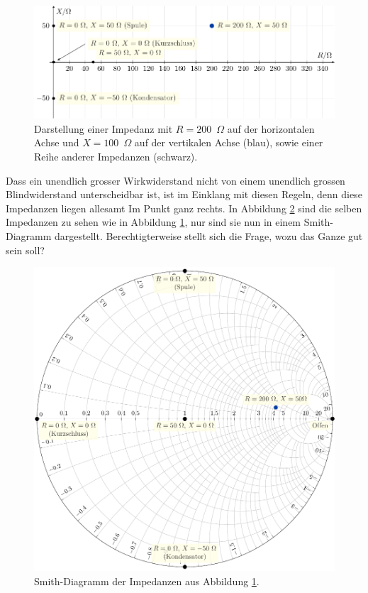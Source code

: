 \documentclass[twoside,a4paper,11pt,halfparskip,DIV=11,notitlepage]{scrartcl}
\begin{document}
\begin{figure}[t]
    \begin{center}
        \includegraphics{figures/complex_plane/complex_plane.pdf}
    \end{center}
    \caption{Darstellung einer Impedanz mit $R=200$~$\Omega$ auf der horizontalen Achse und $X=100$~$\Omega$
    auf der vertikalen Achse (blau), sowie einer Reihe anderer Impedanzen (schwarz).}
    \label{fig:euler}
\end{figure}

Dass ein unendlich grosser Wirkwiderstand nicht von einem unendlich grossen Blindwiderstand unterscheidbar ist,
ist im Einklang mit diesen Regeln, denn diese Impedanzen liegen allesamt Im Punkt ganz rechts.
In Abbildung \ref{fig:smithimpedance} sind die selben Impedanzen zu sehen wie in Abbildung \ref{fig:euler}, nur
sind sie nun in einem Smith-Diagramm dargestellt. Berechtigterweise stellt sich die Frage, wozu das Ganze
gut sein soll?

\begin{figure}
    \includegraphics{figures/complex_smith/complex_smith.pdf}
    \caption{Smith-Diagramm der Impedanzen aus Abbildung \ref{fig:euler}.}
    \label{fig:smithimpedance}
\end{figure}
\end{document}

